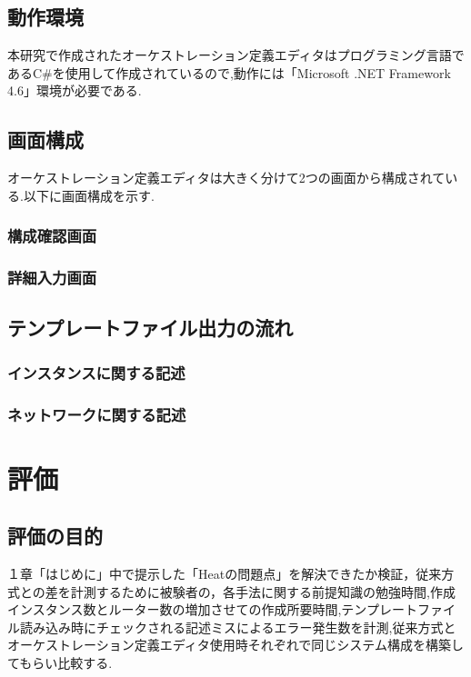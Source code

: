 \documentclass[mingoth]{kut-paper}		%
\begin{document}
	\section{動作環境}
	本研究で作成されたオーケストレーション定義エディタはプログラミング言語であるC\#を使用して作成されているので,動作には「Microsoft .NET Framework 4.6」環境が必要である.
	\section{画面構成}
	オーケストレーション定義エディタは大きく分けて2つの画面から構成されている.以下に画面構成を示す.
		\subsection{構成確認画面}
		
		\subsection{詳細入力画面}
	
	\section{テンプレートファイル出力の流れ}
		\subsection{インスタンスに関する記述}
		
		\subsection{ネットワークに関する記述}
		
\chapter{評価}
	\section{評価の目的}
	１章「はじめに」中で提示した「Heatの問題点」を解決できたか検証，従来方式との差を計測するために被験者の，各手法に関する前提知識の勉強時間,作成インスタンス数とルーター数の増加させての作成所要時間,テンプレートファイル読み込み時にチェックされる記述ミスによるエラー発生数を計測,従来方式とオーケストレーション定義エディタ使用時それぞれで同じシステム構成を構築してもらい比較する.
\end{document}
